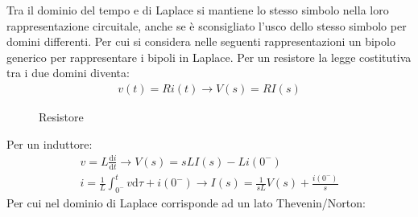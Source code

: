 \documentclass{article}
\newcommand{\df}{\mathrm{d}}
\numberwithin{equation}{subsection}
\begin{document}
Tra il dominio del tempo e di Laplace si mantiene lo stesso simbolo nella loro rappresentazione circuitale, anche se è sconsigliato l'usco dello 
stesso simbolo per domini differenti. Per cui si considera nelle seguenti rappresentazioni un bipolo generico per rappresentare i bipoli in Laplace. Per un resistore la legge costitutiva tra i due domini diventa:
\begin{gather*}
    v(t)=Ri(t)\to V(s)=RI(s)
\end{gather*}
\begin{figure}[ht]%
    \centering
    \qquad
    \caption{Resistore}
    \label{fig:resistore-tempo-laplace}
\end{figure}
Per un induttore:
\begin{gather*}
    v=\displaystyle L\frac{\df i}{\df t}\to V(s)=sLI(s)-Li(0^-)\\
    i=\displaystyle\frac{1}{L}\int_{0^-}^tv\df\tau+i(0^-)\to I(s)=\frac{1}{sL}V(s)+\frac{i(0^-)}{s}
\end{gather*}
Per cui nel dominio di Laplace corrisponde ad un lato Thevenin/Norton:
\end{document}
